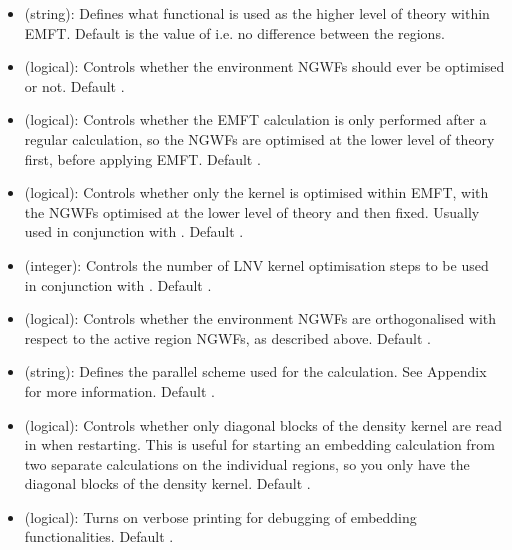 \documentclass[letterpaper,10pt,english]{sphinxmanual}
\begin{document}
\begin{itemize}
\item {} 
 (string): Defines what functional is used as
the higher level of theory within EMFT. Default is the value of
 i.e. no difference between the regions.

\item {} 
 (logical): Controls whether the environment
NGWFs should ever be optimised or not. Default .

\item {} 
 (logical): Controls whether the EMFT calculation
is only performed after a regular calculation, so the NGWFs are
optimised at the lower level of theory first, before applying EMFT.
Default .

\item {} 
 (logical): Controls whether only the kernel is
optimised within EMFT, with the NGWFs optimised at the lower level of
theory and then fixed. Usually used in conjunction with
. Default .

\item {} 
 (integer): Controls the number of LNV kernel
optimisation steps to be used in conjunction with
. Default .

\item {} 
 (logical): Controls whether the environment
NGWFs are orthogonalised with respect to the active region NGWFs, as
described above. Default .

\item {} 
 (string): Defines the parallel scheme used for
the calculation. See Appendix for more information. Default .

\item {} 
 (logical): Controls whether only diagonal
blocks of the density kernel are read in when restarting. This is
useful for starting an embedding calculation from two separate
calculations on the individual regions, so you only have the diagonal
blocks of the density kernel. Default .

\item {} 
 (logical): Turns on verbose printing for debugging of
embedding functionalities. Default .


\end{itemize}
\end{document}
